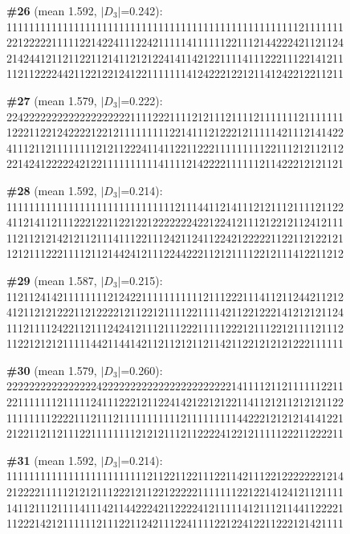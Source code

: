 \documentclass[10pt]{article}
\begin{document}
\noindent\textbf{\#26} (mean 1.592, $|D_3|$=0.242):\\
111111111111111111111111111111111111111111111111111121111111\\
221222221111122142241112242111114111111221112144222421121124\\
214244121121122112141121212241411421221111411122211122141211\\
112112222442112212212412211111114124222122121141242212211211\medskip

\noindent\textbf{\#27} (mean 1.579, $|D_3|$=0.222):\\
224222222222222222222211112221111212111211112111111121111111\\
122211221242222122121111111112214111212221211111421112141422\\
411121121111111121211222411411221122211111111122111212112112\\
221424122222421221111111111411112142222111111211422212121121\medskip

\noindent\textbf{\#28} (mean 1.592, $|D_3|$=0.214):\\
111111111111111111111111111111211144112141112121112111121122\\
411214112111222122112212212222222422122412111212212112412111\\
112112121421211211141112211124211241122421222221122112122121\\
121211122211112112144241211122442221121211112212111412211212\medskip

\noindent\textbf{\#29} (mean 1.587, $|D_3|$=0.215):\\
112112414211111111212422111111111112111222111411211244211212\\
412112121222112122221211221211112211114211221222141212121124\\
111211112422112111242412111211122211111222121112212111121112\\
112212121211111442114414211211212112114211221212121222111111\medskip

\noindent\textbf{\#30} (mean 1.579, $|D_3|$=0.260):\\
222222222222222242222222222222222222222214111121121111112211\\
221111111211111241112221211224142122121221141121211212121122\\
111111112222111211121111111111121111111114422212121214141221\\
212211211211122111111112121211121122224122121111122211222211\medskip

\noindent\textbf{\#31} (mean 1.592, $|D_3|$=0.214):\\
111111111111111111111111121122112211122114211122122222221214\\
212222111112121211122212112212222211111112212214124121121111\\
141121112111141114211442224211222241211111412111211441122221\\
112221421211111121112211242111224111122122412211222121421111\medskip
\end{document}
